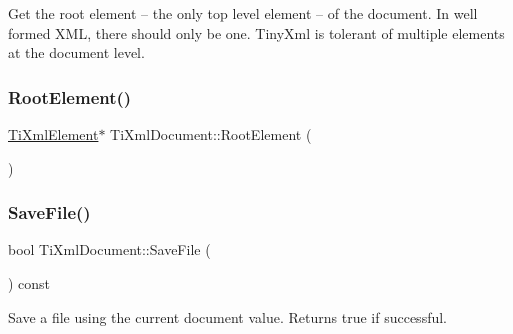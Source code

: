 Get the root element -- the only top level element -- of the document. In well formed X\+ML, there should only be one. Tiny\+Xml is tolerant of multiple elements at the document level. \mbox{\label{class_ti_xml_document_a0b43e762a23f938b06651bc90b8a1013}} 
\subsubsection{\texorpdfstring{Root\+Element()}{RootElement()}\hspace{0.1cm}{\footnotesize\ttfamily [2/2]}}
{\footnotesize\ttfamily \hyperlink{class_ti_xml_element}{Ti\+Xml\+Element}$\ast$ Ti\+Xml\+Document\+::\+Root\+Element (\begin{DoxyParamCaption}{ }\end{DoxyParamCaption})\hspace{0.3cm}{\ttfamily [inline]}}

\mbox{\label{class_ti_xml_document_ab63b96a6af5a467e289c7c75202edad9}} 
\subsubsection{\texorpdfstring{Save\+File()}{SaveFile()}\hspace{0.1cm}{\footnotesize\ttfamily [1/3]}}
{\footnotesize\ttfamily bool Ti\+Xml\+Document\+::\+Save\+File (\begin{DoxyParamCaption}{ }\end{DoxyParamCaption}) const}



Save a file using the current document value. Returns true if successful. 

